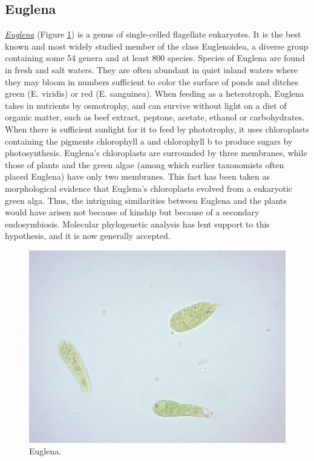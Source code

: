 \subsection{Euglena}\label{euglena}

\href{https://en.wikipedia.org/wiki/Euglena}{\emph{Euglena}} (Figure
\ref{fig:euglena}) is a genus of single-celled flagellate eukaryotes. It
is the best known and most widely studied member of the class
Euglenoidea, a diverse group containing some 54 genera and at least 800
species. Species of Euglena are found in fresh and salt waters. They are
often abundant in quiet inland waters where they may bloom in numbers
sufficient to color the surface of ponds and ditches green (E. viridis)
or red (E. sanguinea). When feeding as a heterotroph, Euglena takes in
nutrients by osmotrophy, and can survive without light on a diet of
organic matter, such as beef extract, peptone, acetate, ethanol or
carbohydrates. When there is sufficient sunlight for it to feed by
phototrophy, it uses chloroplasts containing the pigments chlorophyll a
and chlorophyll b to produce sugars by photosynthesis. Euglena's
chloroplasts are surrounded by three membranes, while those of plants
and the green algae (among which earlier taxonomists often placed
Euglena) have only two membranes. This fact has been taken as
morphological evidence that Euglena's chloroplasts evolved from a
eukaryotic green alga. Thus, the intriguing similarities between Euglena
and the plants would have arisen not because of kinship but because of a
secondary endosymbiosis. Molecular phylogenetic analysis has lent
support to this hypothesis, and it is now generally accepted.

\begin{figure}

{\centering \includegraphics[width=0.7\linewidth]{./figures/protists/euglena} 

}

\caption{Euglena.}\label{fig:euglena}
\end{figure}

